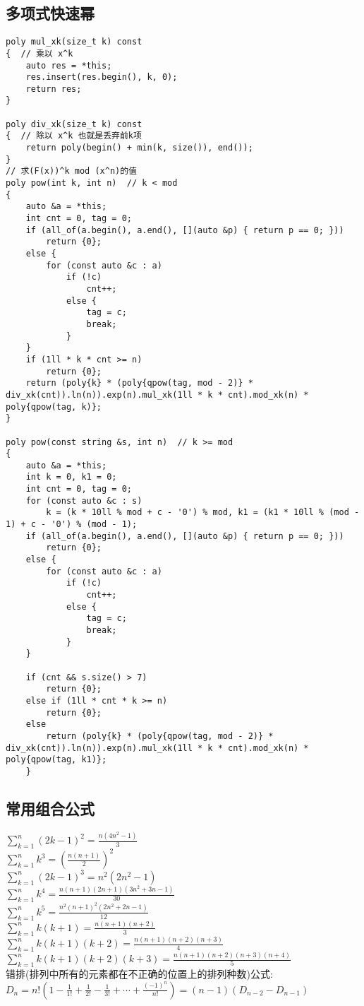 \documentclass[twocolumn,a4]{article}
\begin{document}
\subsection{多项式快速幂}
\begin{lstlisting}
poly mul_xk(size_t k) const
{  // 乘以 x^k
    auto res = *this;
    res.insert(res.begin(), k, 0);
    return res;
}

poly div_xk(size_t k) const
{  // 除以 x^k 也就是丢弃前k项
    return poly(begin() + min(k, size()), end());
}
// 求(F(x))^k mod (x^n)的值
poly pow(int k, int n)  // k < mod
{
    auto &a = *this;
    int cnt = 0, tag = 0;
    if (all_of(a.begin(), a.end(), [](auto &p) { return p == 0; }))
        return {0};
    else {
        for (const auto &c : a)
            if (!c)
                cnt++;
            else {
                tag = c;
                break;
            }
    }
    if (1ll * k * cnt >= n)
        return {0};
    return (poly{k} * (poly{qpow(tag, mod - 2)} * div_xk(cnt)).ln(n)).exp(n).mul_xk(1ll * k * cnt).mod_xk(n) * poly{qpow(tag, k)};
}

poly pow(const string &s, int n)  // k >= mod
{
    auto &a = *this;
    int k = 0, k1 = 0;
    int cnt = 0, tag = 0;
    for (const auto &c : s)
        k = (k * 10ll % mod + c - '0') % mod, k1 = (k1 * 10ll % (mod - 1) + c - '0') % (mod - 1);
    if (all_of(a.begin(), a.end(), [](auto &p) { return p == 0; }))
        return {0};
    else {
        for (const auto &c : a)
            if (!c)
                cnt++;
            else {
                tag = c;
                break;
            }
    }

    if (cnt && s.size() > 7)
        return {0};
    else if (1ll * cnt * k >= n)
        return {0};
    else
        return (poly{k} * (poly{qpow(tag, mod - 2)} * div_xk(cnt)).ln(n)).exp(n).mul_xk(1ll * k * cnt).mod_xk(n) * poly{qpow(tag, k1)};
    }
\end{lstlisting}
\subsection{常用组合公式}
$\displaystyle \sum_{k=1}^{n}(2k-1)^{2}=\frac{n(4n^{2}-1)}{3}$\\
$\displaystyle \sum_{k=1}^{n}k^{3}=\left(\frac{n(n+1)}{2}\right)^{2}$\\
$\displaystyle \sum_{k=1}^{n}(2k-1)^{3}=n^{2}(2n^{2}-1)$\\
$\displaystyle \sum_{k=1}^{n}k^{4}=\frac{n(n+1)(2n+1)(3n^{2}+3n-1)}{30}$\\
$\displaystyle \sum_{k=1}^{n}k^{5}=\frac{n^{2}(n+1)^{2}(2n^{2}+2n-1)}{12}$\\
$\displaystyle \sum_{k=1}^{n}k(k+1)=\frac{n(n+1)(n+2)}{3}$\\
$\displaystyle \sum_{k=1}^{n}k(k+1)(k+2)=\frac{n(n+1)(n+2)(n+3)}{4}$\\
$\displaystyle \sum_{k=1}^{n}k(k+1)(k+2)(k+3)=\frac{n(n+1)(n+2)(n+3)(n+4)}{5}$\\
错排(排列中所有的元素都在不正确的位置上的排列种数)公式:\\
$D_{n}=n!\left(1-\frac{1}{1!}+\frac{1}{2!}-\frac{1}{3!}+\cdots+\frac{(-1)^{n}}{n!}\right)=(n-1)(D_{n-2}-D_{n-1})$\\
\end{document}
